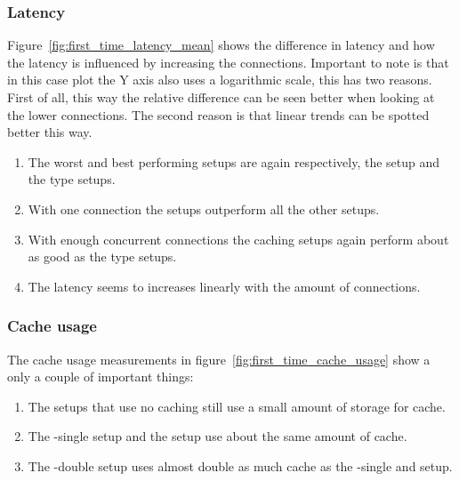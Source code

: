 \documentclass[twoside,openright]{uva-bachelor-thesis}
\begin{document}


\FloatBarrier


\subsubsection{Latency}
Figure~\ref{fig:first_time_latency_mean} shows the difference in
latency and how the latency is influenced by increasing the connections.
Important to note is that in this case plot the Y axis also uses a logarithmic
scale, this has two reasons. First of all, this way the relative difference can
be seen better when looking at the lower connections. The second reason is that
linear trends can be spotted better this way.
\begin{enumerate}
    \item
        The worst and best performing setups are again respectively, the \ipp
        setup and the \cdn type setups.

    \item
        With one connection the \cdn setups outperform all the other setups.

    \item
        With enough concurrent connections the caching \lt setups again perform
        about as good as the \cdn type setups.

    \item
        The latency seems to increases linearly with the amount of connections.



\end{enumerate}



\subsubsection{Cache usage}
The cache usage measurements in figure~\ref{fig:first_time_cache_usage} show a
only a couple of important things:
\begin{enumerate}
    \item
        The setups that use no caching still use a small amount of storage for
        cache.

    \item
        The \lt-single setup and the \cdn setup use about the same amount of
        cache.

    \item
        The \lt-double setup uses almost double as much cache as the
        \lt-single and \cdn setup.
\end{enumerate}
\end{document}
